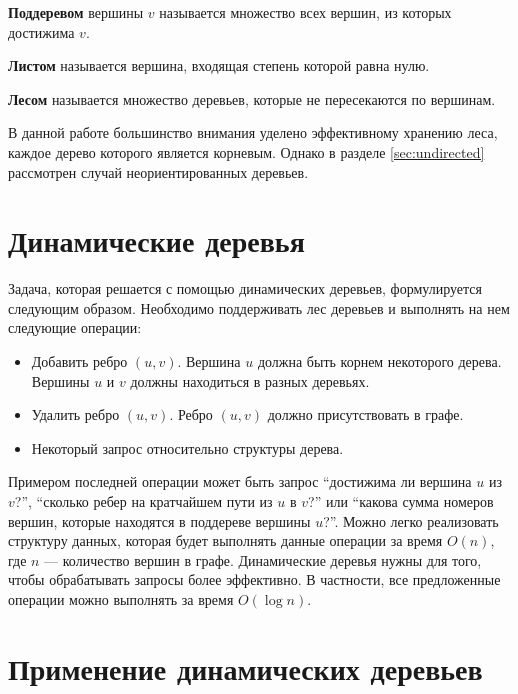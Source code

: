 {\bf Поддеревом} вершины $v$ называется множество всех вершин, из которых достижима $v$.

{\bf Листом} называется вершина, входящая степень которой равна нулю.

{\bf Лесом} называется множество деревьев, которые не пересекаются по вершинам.

В данной работе большинство внимания уделено эффективному хранению леса, каждое дерево которого является корневым. 
Однако в разделе \ref{sec:undirected} рассмотрен случай неориентированных деревьев.

\FloatBarrier

\section{Динамические деревья}

Задача, которая решается с помощью динамических деревьев, формулируется следующим образом. Необходимо поддерживать лес деревьев и выполнять на нем следующие операции:
\begin{itemize}
\item Добавить ребро $(u, v)$. Вершина $u$ должна быть корнем некоторого дерева. Вершины $u$ и $v$ должны находиться в разных деревьях.
\item Удалить ребро $(u, v)$. Ребро $(u, v)$ должно присутствовать в графе.
\item Некоторый запрос относительно структуры дерева.
\end{itemize}

Примером последней операции может быть запрос ``достижима ли вершина $u$ из $v$?'', 
``сколько ребер на кратчайшем пути из $u$ в $v$?'' или ``какова сумма номеров вершин, которые находятся в поддереве вершины $u$?''.
Можно легко реализовать структуру данных, которая будет выполнять данные
 операции за время $O(n)$, где $n$ --- количество вершин в графе. 
Динамические деревья нужны для того, чтобы обрабатывать запросы более эффективно. 
В частности, все предложенные операции можно выполнять за время $O(\log n)$.
  
\FloatBarrier

\section{Применение динамических деревьев}

